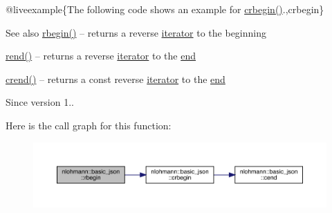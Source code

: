 @liveexample\{The following code shows an example for {\ttfamily \mbox{\hyperlink{classnlohmann_1_1basic__json_a1e0769d22d54573f294da0e5c6abc9de}{crbegin()}}}.,crbegin\}

\begin{DoxySeeAlso}{See also}
\mbox{\hyperlink{classnlohmann_1_1basic__json_a1ef93e2006dbe52667294f5ef38b0b10}{rbegin()}} -- returns a reverse \mbox{\hyperlink{classnlohmann_1_1basic__json_a099316232c76c034030a38faa6e34dca}{iterator}} to the beginning 

\mbox{\hyperlink{classnlohmann_1_1basic__json_ac77aed0925d447744676725ab0b6d535}{rend()}} -- returns a reverse \mbox{\hyperlink{classnlohmann_1_1basic__json_a099316232c76c034030a38faa6e34dca}{iterator}} to the \mbox{\hyperlink{classnlohmann_1_1basic__json_a13e032a02a7fd8a93fdddc2fcbc4763c}{end}} 

\mbox{\hyperlink{classnlohmann_1_1basic__json_a5795b029dbf28e0cb2c7a439ec5d0a88}{crend()}} -- returns a const reverse \mbox{\hyperlink{classnlohmann_1_1basic__json_a099316232c76c034030a38faa6e34dca}{iterator}} to the \mbox{\hyperlink{classnlohmann_1_1basic__json_a13e032a02a7fd8a93fdddc2fcbc4763c}{end}}
\end{DoxySeeAlso}
\begin{DoxySince}{Since}
version 1.. 
\end{DoxySince}
Here is the call graph for this function\+:
\nopagebreak
\begin{figure}[H]
\begin{center}
\leavevmode
\includegraphics[width=350pt]{classnlohmann_1_1basic__json_a515e7618392317dbf4b72d3e18bf2ab2_cgraph}
\end{center}
\end{figure}
\mbox{\label{classnlohmann_1_1basic__json_ac77aed0925d447744676725ab0b6d535}} 
